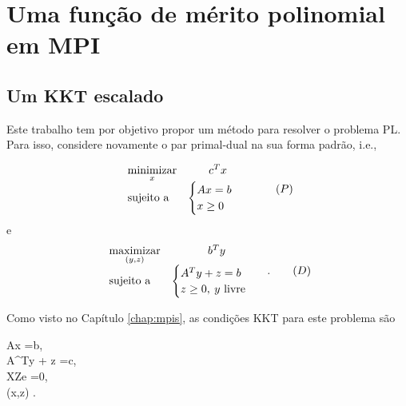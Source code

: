 





	\chapter{Uma função de mérito polinomial em \ac{MPI}}
\label{chap:merit-function}
\section{Um KKT escalado}


 
Este  trabalho tem por objetivo propor um método para resolver o problema
\ac{PL}. Para isso, considere novamente o par primal-dual na sua forma padrão,
i.e.,  

 \begin{equation*}
	\begin{array}{lc}
\displaystyle \operatorname*{minimizar}_{x} & c^Tx \\
\text{sujeito a} &\begin{cases} Ax = b \\
				 x \geq 0	
				 \end{cases}\
\end{array}\tag{$P$}
\end{equation*}
e 
 \begin{equation}
	\begin{array}{lc}
\displaystyle \operatorname*{maximizar}_{(y,z)} & b^Ty \\
\text{sujeito a} &\begin{cases} A^Ty + z = b \\
				 z \geq 0, \:y \text{ livre}	
				 \end{cases}\
\end{array}.
\tag{$D$}
\end{equation}

Como visto no Capítulo \ref{chap:mpis}, as condições \ac{KKT}  para este
problema são

\begin{subnumcases}{\label{eq:KKT-choice}}
Ax =b,\label{eq:KKT-fac-primal-choice}\\
A^Ty + z =c, \label{eq:KKT-fac-dual-choice}\\
XZe =0,  \label{eq:KKT-complementar-choice}\\
(x,z) \geq 0. \label{eq:KKT-nao-negativ-choice}
\end{subnumcases}


